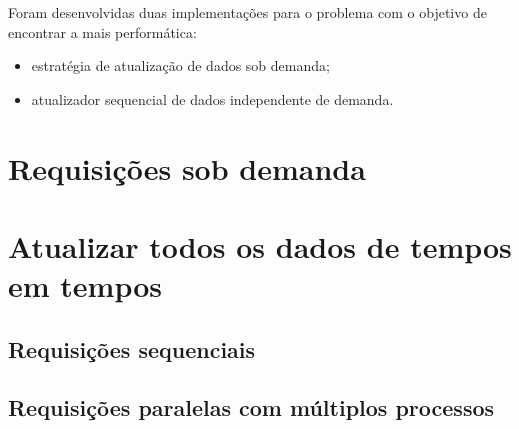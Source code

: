 \label{Cap:implementacao}

Foram desenvolvidas duas implementações para o problema com o objetivo de encontrar a mais performática:

\begin{itemize}
\item estratégia de atualização de dados sob demanda;
\item atualizador sequencial de dados independente de demanda.
\end{itemize}

\section{Requisições sob demanda}

\section{Atualizar todos os dados de tempos em tempos}

\subsection{Requisições sequenciais}

\subsection{Requisições paralelas com múltiplos processos}

